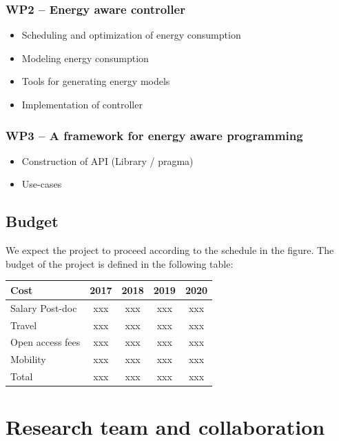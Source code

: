\documentclass{article}
\begin{document}
\subsubsection{WP2 -- Energy aware controller}
\begin{itemize}
 \item Scheduling and optimization of energy consumption
 \item Modeling energy consumption
 \item Tools for generating energy models
 \item Implementation of controller
\end{itemize}

\subsubsection{WP3 -- A framework for energy aware programming}
\begin{itemize}
 \item Construction of API (Library / pragma)
 \item Use-cases
\end{itemize}


\subsection{Budget}
We expect the project to proceed according to the schedule in the figure.
The budget of the project is defined in the following table:
\begin{table}[h]
\begin{center}
\begin{tabular}{ | l | c | c |c |c |}
\hline
{Cost} & {2017} & {2018} & {2019} & {2020} \\ \hline
{Salary Post-doc} & xxx & xxx & xxx & xxx \\ \hline
{Travel} & xxx & xxx & xxx & xxx  \\ \hline
{Open access fees} & xxx & xxx & xxx & xxx  \\ \hline
{Mobility} & xxx & xxx & xxx & xxx  \\ \hline
{Total} & xxx & xxx & xxx & xxx  \\ \hline
\end{tabular}
\label{tab:strconf}
\end{center}

\end{table}

\section{Research team and collaboration}
\end{document}
